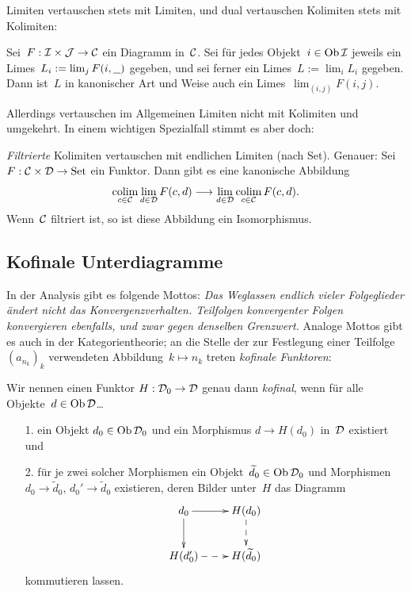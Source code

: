 Limiten vertauschen stets mit Limiten, und dual vertauschen Kolimiten stets mit Kolimiten:
\begin{prop}
Sei~$F : \mathcal{I} \times \mathcal{J} \to \mathcal{C}$ ein Diagramm in~$\mathcal{C}$. Sei für jedes Objekt~$i \in
\operatorname{Ob}\mathcal{I}$ jeweils ein Limes~$L_i := \lim_j F(i, \underline{\ \ })$ gegeben, und sei ferner
ein Limes~$L := \lim_i L_i$ gegeben. Dann ist~$L$ in kanonischer Art und Weise
auch ein Limes~$\lim_{(i,j)} F(i,j)$.
\end{prop}

Allerdings vertauschen im Allgemeinen Limiten nicht mit Kolimiten und
umgekehrt. In einem wichtigen Spezialfall stimmt es aber doch:
\begin{prop}\emph{Filtrierte} Kolimiten vertauschen mit endlichen Limiten (nach
Set). Genauer: Sei~$F : \mathcal{C} \times \mathcal{D} \to \mathrm{Set}$ ein Funktor. Dann gibt es eine
kanonische Abbildung
\[ \operatorname*{colim}\limits_{c \in \mathcal{C}}\lim\limits_{d \in \mathcal{D}} F(c,d) \longrightarrow
  \lim\limits_{d \in \mathcal{D}} \operatorname*{colim}\limits_{c \in \mathcal{C}} F(c,d). \]
Wenn~$\mathcal{C}$ filtriert ist, so ist diese Abbildung ein Isomorphismus.
\end{prop}


\subsection{Kofinale Unterdiagramme}

In der Analysis gibt es folgende Mottos: \emph{Das Weglassen endlich vieler Folgeglieder
ändert nicht das Konvergenzverhalten. Teilfolgen konvergenter Folgen
konvergieren ebenfalls, und zwar gegen denselben Grenzwert.} Analoge Mottos
gibt es auch in der Kategorientheorie; an die Stelle der zur Festlegung einer
Teilfolge~$(a_{n_k})_k$ verwendeten Abbildung~$k \mapsto n_k$ treten
\emph{kofinale Funktoren}:

\begin{defn}
Wir nennen einen Funktor $H : \mathcal{D}_0 \to \mathcal{D}$ genau dann \emph{kofinal}, wenn
für alle Objekte~$d \in \operatorname{Ob}\mathcal{D}$\ldots
\begin{enumerate}
\item[1.] ein Objekt $d_0 \in \operatorname{Ob}\mathcal{D}_0$ und ein Morphismus $d \to
H(d_0)$ in~$\mathcal{D}$ existiert und
\item[2.] für je zwei solcher Morphismen ein Objekt~$\widetilde d_0 \in \operatorname{Ob}\mathcal{D}_0$ und
Morphismen $d_0 \to \widetilde d_0$, $d_0' \to \widetilde d_0$ existieren, deren Bilder
unter~$H$ das Diagramm
\[ \xymatrix{
  d_0 \ar[r] \ar[d] & H(d_0) \ar@{-->}[d] \\
  H(d_0') \ar@{-->}[r] & H(\widetilde d_0)
} \]
kommutieren lassen.
\end{enumerate}
\end{defn}


